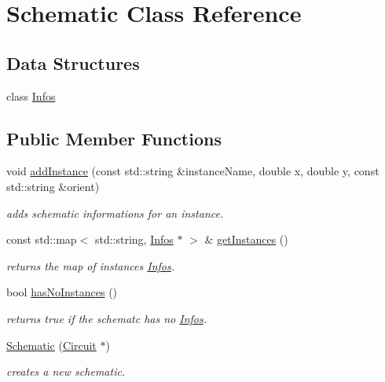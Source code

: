 \hypertarget{class_open_chams_1_1_schematic}{}\section{Schematic Class Reference}
\label{class_open_chams_1_1_schematic}
\subsection*{Data Structures}
\begin{DoxyCompactItemize}
\item 
class \hyperlink{class_open_chams_1_1_schematic_1_1_infos}{Infos}
\end{DoxyCompactItemize}
\subsection*{Public Member Functions}
\begin{DoxyCompactItemize}
\item 
void \hyperlink{class_open_chams_1_1_schematic_ac7fc9f5cdf1e22c53d42e6606e1af8ef}{add\+Instance} (const std\+::string \&instance\+Name, double x, double y, const std\+::string \&orient)
\begin{DoxyCompactList}\small\item\em adds schematic informations for an instance. \end{DoxyCompactList}\item 
\mbox{\label{class_open_chams_1_1_schematic_afa015b02922d82de9c44e8ffe8dc5d56}} 
const std\+::map$<$ std\+::string, \hyperlink{class_open_chams_1_1_schematic_1_1_infos}{Infos} $\ast$ $>$ \& \hyperlink{class_open_chams_1_1_schematic_afa015b02922d82de9c44e8ffe8dc5d56}{get\+Instances} ()
\begin{DoxyCompactList}\small\item\em returns the map of instance\textquotesingle{}s \hyperlink{class_open_chams_1_1_schematic_1_1_infos}{Infos}. \end{DoxyCompactList}\item 
\mbox{\label{class_open_chams_1_1_schematic_adab62a25face462baec9a7fffb2b6158}} 
bool \hyperlink{class_open_chams_1_1_schematic_adab62a25face462baec9a7fffb2b6158}{has\+No\+Instances} ()
\begin{DoxyCompactList}\small\item\em returns true if the schematc has no \hyperlink{class_open_chams_1_1_schematic_1_1_infos}{Infos}. \end{DoxyCompactList}\item 
\hyperlink{class_open_chams_1_1_schematic_a88d7382ee58bc8d509a8f9b05a57e8b3}{Schematic} (\hyperlink{class_open_chams_1_1_circuit}{Circuit} $\ast$)
\begin{DoxyCompactList}\small\item\em creates a new schematic. \end{DoxyCompactList}\end{DoxyCompactItemize}


